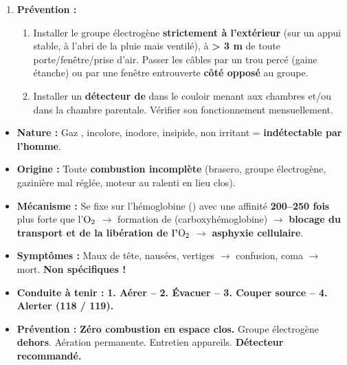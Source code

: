 \documentclass[11pt]{article}
\newcounter{popsec}
\newcounter{popsub}
\newcommand{\courssub}[1]{%
  \stepcounter{popsub}%
  \par\vspace{9pt}\noindent{\popxbold\fontsize{11.5}{13}\selectfont\color{popink}{\color{poporange}\thepopsec.\thepopsub}\hspace{6pt}#1}\par\nopagebreak\vspace{4pt}
}
\begin{document}
\begin{exoresolu}
\begin{enumerate}
\begin{enumerate}
    \end{enumerate}
    \item \textbf{Prévention :}
    \begin{enumerate}
        \item Installer le groupe électrogène \textbf{strictement à l'extérieur} (sur un appui stable, à l'abri de la pluie mais ventilé), à \textbf{> 3 m} de toute porte/fenêtre/prise d'air. Passer les câbles par un trou percé (gaine étanche) ou par une fenêtre entrouverte \textbf{côté opposé} au groupe.
        \item Installer un \textbf{détecteur de } dans le couloir menant aux chambres et/ou dans la chambre parentale. Vérifier son fonctionnement mensuellement.
    \end{enumerate}
\end{enumerate}
\end{exoresolu}

\courssub{Bilan de la section}

\begin{aretenir}
\begin{itemize}
    \item \textbf{Nature :} Gaz , incolore, inodore, insipide, non irritant = \textbf{indétectable par l'homme}.
    \item \textbf{Origine :} Toute \textbf{combustion incomplète} (brasero, groupe électrogène, gazinière mal réglée, moteur au ralenti en lieu clos).
    \item \textbf{Mécanisme :} Se fixe sur l'hémoglobine () avec une affinité \textbf{200--250 fois} plus forte que l'$\ce{O2}$ $\rightarrow$ formation de  (carboxyhémoglobine) $\rightarrow$ \textbf{blocage du transport et de la libération de l'$\ce{O2}$} $\rightarrow$ \textbf{asphyxie cellulaire}.
    \item \textbf{Symptômes :} Maux de tête, nausées, vertiges $\rightarrow$ confusion, coma $\rightarrow$ mort. \textbf{Non spécifiques !}
    \item \textbf{Conduite à tenir :} \textbf{1. Aérer -- 2. Évacuer -- 3. Couper source -- 4. Alerter (118 / 119).}
    \item \textbf{Prévention :} \textbf{Zéro combustion en espace clos.} Groupe électrogène \textbf{dehors}. Aération permanente. Entretien appareils. \textbf{Détecteur  recommandé.}
\end{itemize}
\end{aretenir}
\end{document}
